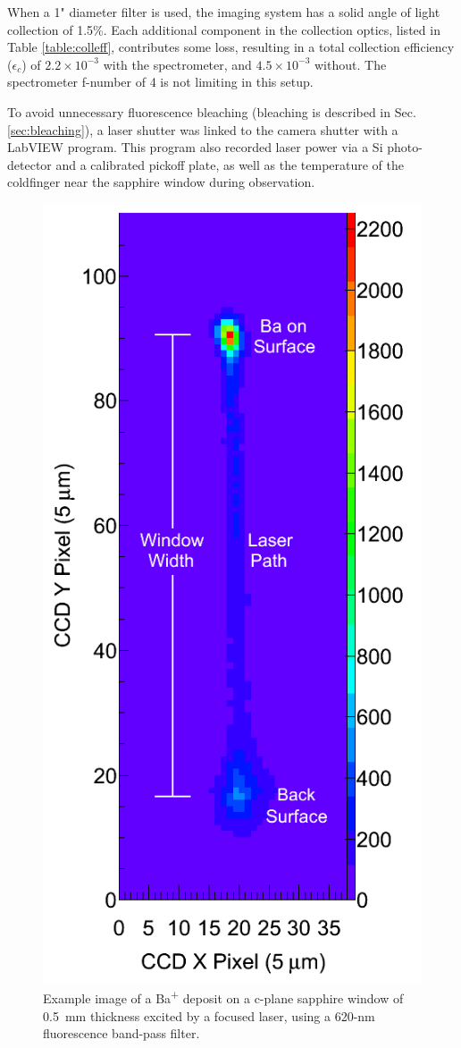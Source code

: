 When a 1" diameter filter is used, the imaging system has a solid angle of light collection of 1.5\%.  Each additional component in the collection optics, listed in Table \ref{table:colleff}, contributes some loss, resulting in a total collection efficiency ($\epsilon_{c}$) of $2.2 \times 10^{-3}$ with the spectrometer, and $4.5 \times 10^{-3}$ without.  The spectrometer f-number of 4 is not limiting in this setup.


To avoid unnecessary fluorescence bleaching (bleaching is described in Sec. \ref{sec:bleaching}), a laser shutter was linked to the camera shutter with a LabVIEW program.  This program also recorded laser power via a Si photo-detector and a calibrated pickoff plate, as well as the temperature of the coldfinger near the sapphire window during observation.


\begin{figure} %
        \centering
                \includegraphics[width=.4\textwidth]{figures/imageExamp.png}
                \caption{Example image of a Ba\textsuperscript{+} deposit on a c-plane sapphire window of 0.5~mm thickness excited by a focused laser, using a 620-nm fluorescence band-pass filter.}
\label{fig:imageexamp}
\end{figure}

